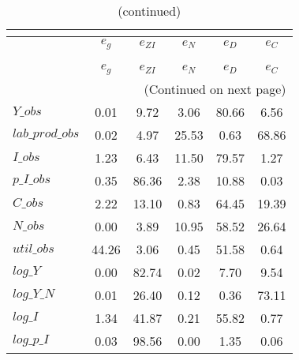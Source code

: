  
\begin{center}
\begin{longtable}{lccccc} 
\caption{VARIANCE DECOMPOSITION (in percent)}\\
 \label{Table:th_var_decomp_uncond}\\
\toprule 
$                $	 & 	 $       {e_g}$	 & 	 $    {e_{ZI}}$	 & 	 $       {e_N}$	 & 	 $       {e_D}$	 & 	 $       {e_C}$\\
\midrule \endfirsthead 
\caption{(continued)}\\
 \toprule \\ 
$                $	 & 	 $       {e_g}$	 & 	 $    {e_{ZI}}$	 & 	 $       {e_N}$	 & 	 $       {e_D}$	 & 	 $       {e_C}$\\
\midrule \endhead 
\midrule \multicolumn{6}{r}{(Continued on next page)} \\ \bottomrule \endfoot 
\bottomrule \endlastfoot 
$Y\_obs          $	 & 	        0.01	 & 	        9.72	 & 	        3.06	 & 	       80.66	 & 	        6.56 \\ 
$lab\_prod\_obs  $	 & 	        0.02	 & 	        4.97	 & 	       25.53	 & 	        0.63	 & 	       68.86 \\ 
$I\_obs          $	 & 	        1.23	 & 	        6.43	 & 	       11.50	 & 	       79.57	 & 	        1.27 \\ 
$p\_I\_obs       $	 & 	        0.35	 & 	       86.36	 & 	        2.38	 & 	       10.88	 & 	        0.03 \\ 
$C\_obs          $	 & 	        2.22	 & 	       13.10	 & 	        0.83	 & 	       64.45	 & 	       19.39 \\ 
$N\_obs          $	 & 	        0.00	 & 	        3.89	 & 	       10.95	 & 	       58.52	 & 	       26.64 \\ 
$util\_obs       $	 & 	       44.26	 & 	        3.06	 & 	        0.45	 & 	       51.58	 & 	        0.64 \\ 
$log\_Y          $	 & 	        0.00	 & 	       82.74	 & 	        0.02	 & 	        7.70	 & 	        9.54 \\ 
$log\_Y\_N       $	 & 	        0.01	 & 	       26.40	 & 	        0.12	 & 	        0.36	 & 	       73.11 \\ 
$log\_I          $	 & 	        1.34	 & 	       41.87	 & 	        0.21	 & 	       55.82	 & 	        0.77 \\ 
$log\_p\_I       $	 & 	        0.03	 & 	       98.56	 & 	        0.00	 & 	        1.35	 & 	        0.06 \\ 

\end{longtable}
\end{center}
